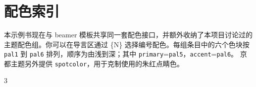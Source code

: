 \chapter*{配色索引}

本示例书现在与 beamer 模板共享同一套配色接口，并额外收纳了本项目讨论过的主题配色组。你可以在导言区通过
\{N\} 选择编号配色。每组条目中的六个色块按
\texttt{pal1} 到 \texttt{pal6} 排列，顺序为由浅到深；其中
\texttt{primary}=\texttt{pal5}，\texttt{accent}=\texttt{pal6}。
京都主题另外提供 \texttt{spotcolor}，用于克制使用的朱红点睛色。

\begin{fullwidth}
\scriptsize
\begin{multicols}{3}
\raggedcolumns
\bookpaletteguideentries
\end{multicols}
\end{fullwidth}



